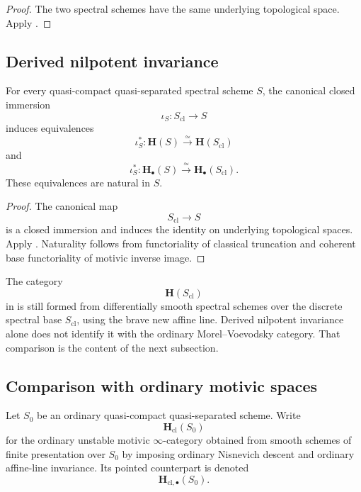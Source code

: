 \begin{proof}
The two spectral schemes have the same underlying topological space.
Apply .
\end{proof}

\subsection{Derived nilpotent invariance}

\begin{theorem}
\label{thm:derived-nilpotent-invariance}
For every quasi-compact quasi-separated spectral scheme \(S\), the
canonical closed immersion
\[
    \iota_S
    \colon
    S_{\mathrm{cl}}
    \longrightarrow
    S
\]
induces equivalences
\[
    \iota_S^*
    \colon
    \mathbf H(S)
    \xrightarrow{\simeq}
    \mathbf H(S_{\mathrm{cl}})
\]
and
\[
    \iota_S^*
    \colon
    \mathbf H_\bullet(S)
    \xrightarrow{\simeq}
    \mathbf H_\bullet(S_{\mathrm{cl}}).
\]
These equivalences are natural in \(S\).
\end{theorem}

\begin{proof}
The canonical map
\[
    S_{\mathrm{cl}}
    \longrightarrow
    S
\]
is a closed immersion and induces the identity on underlying
topological spaces.  Apply
.  Naturality follows
from functoriality of classical truncation and coherent base
functoriality of motivic inverse image.
\end{proof}

\begin{remark}
\label{rem:meaning-derived-nilpotent-invariance}
The category
\[
    \mathbf H(S_{\mathrm{cl}})
\]
in  is still formed from
differentially smooth spectral schemes over the discrete spectral base
\(S_{\mathrm{cl}}\), using the brave new affine line.  Derived
nilpotent invariance alone does not identify it with the ordinary
Morel--Voevodsky category.  That comparison is the content of the next
subsection.
\end{remark}

\subsection{Comparison with ordinary motivic spaces}

\begin{definition}
\label{def:ordinary-motivic-spaces}
Let \(S_0\) be an ordinary quasi-compact quasi-separated scheme.  Write
\[
    \mathbf H_{\mathrm{cl}}(S_0)
\]
for the ordinary unstable motivic \(\infty\)-category obtained from
smooth schemes of finite presentation over \(S_0\) by imposing ordinary
Nisnevich descent and ordinary affine-line invariance.  Its pointed
counterpart is denoted
\[
    \mathbf H_{\mathrm{cl},\bullet}(S_0).
\]
\end{definition}

